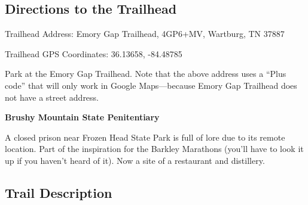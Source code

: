 \documentclass[
  letterpaper,
  DIV=11,
  numbers=noendperiod]{scrreprt}
\begin{document}
\subsection{Directions to the
Trailhead}\label{directions-to-the-trailhead-11}

Trailhead Address: Emory Gap Trailhead, 4GP6+MV, Wartburg, TN 37887

Trailhead GPS Coordinates: 36.13658, -84.48785

Park at the Emory Gap Trailhead. Note that the above address uses a
``Plus code'' that will only work in Google Maps---because Emory Gap
Trailhead does not have a street address.

\begin{tcolorbox}[enhanced jigsaw, colframe=quarto-callout-note-color-frame, breakable, colback=white, bottomrule=.15mm, left=2mm, arc=.35mm, rightrule=.15mm, toprule=.15mm, opacityback=0, leftrule=.75mm]
\begin{minipage}[t]{5.5mm}
\textcolor{quarto-callout-note-color}{\faInfo}
\end{minipage}%
\begin{minipage}[t]{\textwidth - 5.5mm}

\vspace{-3mm}\textbf{Brushy Mountain State Penitentiary}\vspace{3mm}

A closed prison near Frozen Head State Park is full of lore due to its
remote location. Part of the inspiration for the Barkley Marathons
(you'll have to look it up if you haven't heard of it). Now a site of a
restaurant and distillery.

\end{minipage}%
\end{tcolorbox}

\subsection{Trail Description}\label{trail-description-12}
\end{document}
